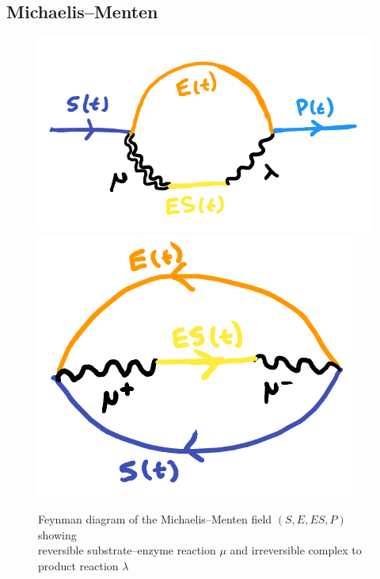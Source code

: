 \documentclass{article}[12pt]
\numberwithin{equation}{section}
\begin{document}
\subsection{Michaelis--Menten}
\begin{figure}[H]
\centering{}
\captionsetup{justification=centering}
\includegraphics[scale=0.35]{figures/michaelismentenfield}
\includegraphics[scale=0.35]{figures/reversiblefield}
\caption{Feynman diagram of the Michaelis--Menten field $(S,E,ES,P)$ showing \\
reversible substrate--enzyme reaction $\mu$ and irreversible complex to product
reaction $\lambda$}
\label{fig:michaelismentenfield}
\end{figure}



\appendix
\end{document}
